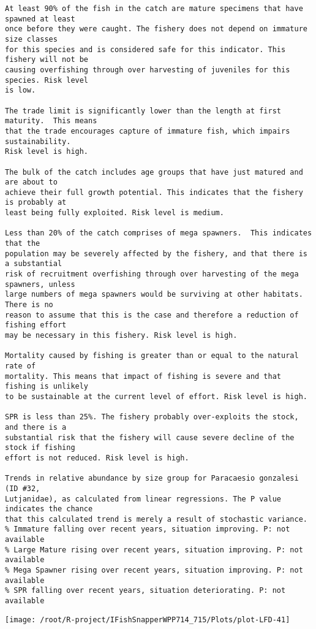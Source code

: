 \documentclass{report}\usepackage[]{graphicx}\usepackage[]{color}
\makeatletter
\def\maxwidth{ %
  \ifdim\Gin@nat@width>\linewidth
    \linewidth
  \else
    \Gin@nat@width
  \fi
}
\newenvironment{kframe}{%
 \def\at@end@of@kframe{}%
 \ifinner\ifhmode%
  \def\at@end@of@kframe{\end{minipage}}%
  \begin{minipage}{\columnwidth}%
 \fi\fi%
 \def\FrameCommand##1{\hskip\@totalleftmargin \hskip-\fboxsep
 \colorbox{shadecolor}{##1}\hskip-\fboxsep
     \hskip-\linewidth \hskip-\@totalleftmargin \hskip\columnwidth}%
 \MakeFramed {\advance\hsize-\width
   \@totalleftmargin\z@ \linewidth\hsize
   \@setminipage}}%
 {\par\unskip\endMakeFramed%
 \at@end@of@kframe}
\newenvironment{knitrout}{}{} %
\makeatother
\begin{document}
\begin{knitrout}
\begin{kframe}
\begin{verbatim}
At least 90% of the fish in the catch are mature specimens that have spawned at least
once before they were caught. The fishery does not depend on immature size classes
for this species and is considered safe for this indicator. This fishery will not be
causing overfishing through over harvesting of juveniles for this species. Risk level
is low.

The trade limit is significantly lower than the length at first maturity.  This means
that the trade encourages capture of immature fish, which impairs sustainability.
Risk level is high.

The bulk of the catch includes age groups that have just matured and are about to
achieve their full growth potential. This indicates that the fishery is probably at
least being fully exploited. Risk level is medium.

Less than 20% of the catch comprises of mega spawners.  This indicates that the
population may be severely affected by the fishery, and that there is a substantial
risk of recruitment overfishing through over harvesting of the mega spawners, unless
large numbers of mega spawners would be surviving at other habitats. There is no
reason to assume that this is the case and therefore a reduction of fishing effort
may be necessary in this fishery. Risk level is high.
 
Mortality caused by fishing is greater than or equal to the natural rate of
mortality. This means that impact of fishing is severe and that fishing is unlikely
to be sustainable at the current level of effort. Risk level is high.
 
SPR is less than 25%. The fishery probably over-exploits the stock, and there is a
substantial risk that the fishery will cause severe decline of the stock if fishing
effort is not reduced. Risk level is high.
 
Trends in relative abundance by size group for Paracaesio gonzalesi (ID #32,
Lutjanidae), as calculated from linear regressions. The P value indicates the chance
that this calculated trend is merely a result of stochastic variance.
% Immature falling over recent years, situation improving. P: not available
% Large Mature rising over recent years, situation improving. P: not available
% Mega Spawner rising over recent years, situation improving. P: not available
% SPR falling over recent years, situation deteriorating. P: not available
\end{verbatim}
\end{kframe}
\texttt{[image: /root/R-project/IFishSnapperWPP714\_715/Plots/plot-LFD-41]} 


\end{knitrout}
\end{document}

